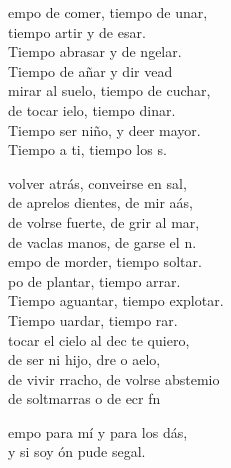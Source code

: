 \begin{cancion}
\begin{chorus}
	empo de comer, tiempo de unar,\\
	tiempo artir y de esar.\\
	Tiempo  abrasar y de ngelar.\\
	Tiempo de añar y dir vead\\
	 mirar al suelo, tiempo de cuchar,\\
	de tocar ielo, tiempo dinar.\\
	Tiempo  ser niño, y deer mayor.\\
	Tiempo a ti, tiempo  los s.\\
	\end{chorus}%
	 volver atrás, conveirse en sal,\\
	de aprelos dientes, de mir aás,\\
	de volrse fuerte, de grir al mar,\\
	de vaclas manos, de garse el n.\\
	empo de morder, tiempo  soltar.\\
	po de plantar, tiempo  arrar.\\
	Tiempo  aguantar, tiempo  explotar.\\
	Tiempo uardar, tiempo  rar.\\
	 tocar el cielo al dec te quiero,\\
	de ser ni hijo, dre o aelo,\\
	de vivir rracho, de volrse abstemio\\
	de soltmarras o de ecr  fn\\
	\begin{chorus}%
	empo para mí y para los dás,\\
	y si soy ón pude segal.\\

\end{chorus}
\end{cancion}
